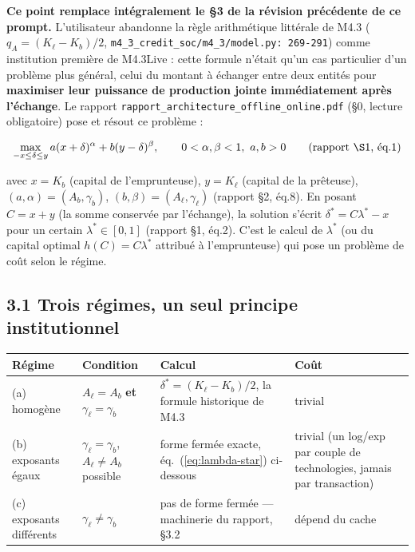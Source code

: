 \documentclass[11pt,a4paper]{article}
\newcommand{\code}[1]{\texttt{#1}}
\begin{document}
\textbf{Ce point remplace intégralement le \S3 de la révision précédente
de ce prompt.} L'utilisateur abandonne la règle arithmétique littérale
de M4.3 ($q_A=(K_\ell-K_b)/2$, \code{m4\_3\_credit\_soc/m4\_3/model.py:
269-291}) comme institution première de M4.3Live : cette formule n'était
qu'un cas particulier d'un problème plus général, celui du montant à
échanger entre deux entités pour \textbf{maximiser leur puissance de
production jointe immédiatement après l'échange}. Le rapport
\code{rapport\_architecture\_offline\_online.pdf} (\S0, lecture
obligatoire) pose et résout ce problème :

$$\max_{-x \le \delta \le y} a(x+\delta)^{\alpha} + b(y-\delta)^{\beta},
\qquad 0<\alpha,\beta<1,\ a,b>0 \qquad \text{(rapport \S1, éq.1)}$$

avec $x=K_b$ (capital de l'emprunteuse), $y=K_\ell$ (capital de la
prêteuse), $(a,\alpha)=(A_b,\gamma_b)$, $(b,\beta)=(A_\ell,\gamma_\ell)$
(rapport \S2, éq.8). En posant $C=x+y$ (la somme conservée par
l'échange), la solution s'écrit $\delta^{*}=C\lambda^{*}-x$ pour un
certain $\lambda^{*}\in[0,1]$ (rapport \S1, éq.2). C'est le calcul de
$\lambda^{*}$ (ou du capital optimal $h(C)=C\lambda^{*}$ attribué à
l'emprunteuse) qui pose un problème de coût selon le régime.

\subsection*{3.1 Trois régimes, un seul principe institutionnel}

\begin{center}
\begin{tabular}{@{}p{2.1cm} p{3.6cm} p{5.9cm} p{2.9cm}@{}}
\toprule
Régime & Condition & Calcul & Coût \\
\midrule
(a) homogène & $A_\ell=A_b$ \textbf{et} $\gamma_\ell=\gamma_b$ &
  $\delta^{*}=(K_\ell-K_b)/2$, la formule historique de M4.3 &
  trivial \\[0.4em]
(b) exposants égaux & $\gamma_\ell=\gamma_b$, $A_\ell\neq A_b$ possible &
  forme fermée exacte, éq.~(\ref{eq:lambda-star}) ci-dessous &
  trivial (un log/exp par couple de technologies, jamais par
  transaction) \\[0.4em]
(c) exposants différents & $\gamma_\ell\neq\gamma_b$ &
  pas de forme fermée --- machinerie du rapport, \S3.2 &
  dépend du cache \\
\bottomrule
\end{tabular}
\end{center}
\end{document}
